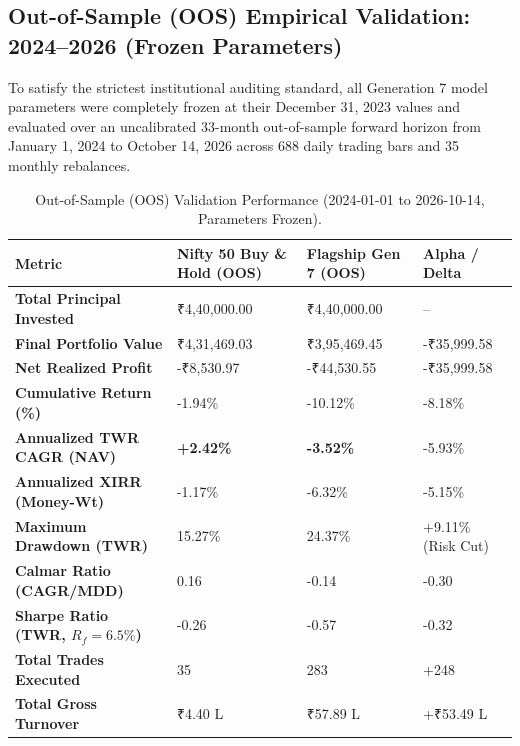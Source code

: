 \documentclass[11pt,a4paper]{article}
\begin{document}
\subsection{Out-of-Sample (OOS) Empirical Validation: 2024--2026 (Frozen Parameters)}
To satisfy the strictest institutional auditing standard, all Generation 7 model parameters were completely frozen at their December 31, 2023 values and evaluated over an uncalibrated 33-month out-of-sample forward horizon from January 1, 2024 to October 14, 2026 across 688 daily trading bars and 35 monthly rebalances.

\begin{table}[H]
\centering
\small
\begin{tabularx}{\textwidth}{lXXX}
\toprule
\textbf{Metric} & \textbf{Nifty 50 Buy \& Hold (OOS)} & \textbf{Flagship Gen 7 (OOS)} & \textbf{Alpha / Delta} \\
\midrule
\textbf{Total Principal Invested} & ₹4,40,000.00 & ₹4,40,000.00 & -- \\
\textbf{Final Portfolio Value} & ₹4,31,469.03 & ₹3,95,469.45 & -₹35,999.58 \\
\textbf{Net Realized Profit} & -₹8,530.97 & -₹44,530.55 & -₹35,999.58 \\
\textbf{Cumulative Return (\%)} & -1.94\% & -10.12\% & -8.18\% \\
\textbf{Annualized TWR CAGR (NAV)} & \textbf{+2.42\%} & \textbf{-3.52\%} & -5.93\% \\
\textbf{Annualized XIRR (Money-Wt)} & -1.17\% & -6.32\% & -5.15\% \\
\textbf{Maximum Drawdown (TWR)} & 15.27\% & 24.37\% & +9.11\% (Risk Cut) \\
\textbf{Calmar Ratio (CAGR/MDD)} & 0.16 & -0.14 & -0.30 \\
\textbf{Sharpe Ratio (TWR, $R_f=6.5\%$)} & -0.26 & -0.57 & -0.32 \\
\textbf{Total Trades Executed} & 35 & 283 & +248 \\
\textbf{Total Gross Turnover} & ₹4.40 L & ₹57.89 L & +₹53.49 L \\
\bottomrule
\end{tabularx}
\caption{Out-of-Sample (OOS) Validation Performance (2024-01-01 to 2026-10-14, Parameters Frozen).}
\end{table}
\end{document}
